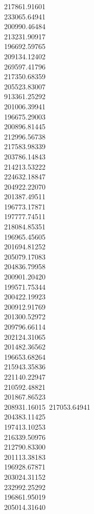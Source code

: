 217861.91601\\
233065.64941\\
200990.46484\\
213231.90917\\
196692.59765\\
209134.12402\\
269597.41796\\
217350.68359\\
205523.83007\\
913361.25292\\
201006.39941\\
196675.29003\\
200896.81445\\
212996.56738\\
217583.98339\\
203786.14843\\
214213.53222\\
224632.18847\\
204922.22070\\
201387.49511\\
196773.17871\\
197777.74511\\
218084.85351\\
196965.45605\\
201694.81252\\
205079.17083\\
204836.79958\\
200901.20420\\
199571.75344\\
200422.19923\\
200912.91769\\
201300.52972\\
209796.66114\\
202124.31065\\
201482.36562\\
196653.68264\\
215943.35836\\
221140.22947\\
210592.48821\\
201867.86523\\
208931.16015\
217053.64941\\
204383.11425\\
197413.10253\\
216339.50976\\
212790.83300\\
201113.38183\\
196928.67871\\
203024.31152\\
232992.25292\\
196861.95019\\
205014.31640\\
